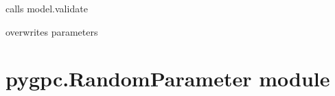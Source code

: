 \documentclass[letterpaper,10pt,english,openany,oneside]{sphinxmanual}
\begin{document}
\begin{fulllineitems}
\begin{fulllineitems}
calls model.validate

overwrites parameters

\end{fulllineitems}


\end{fulllineitems}



\section{pygpc.RandomParameter module}
\label{\detokenize{pygpc:module-pygpc.RandomParameter}}\label{\detokenize{pygpc:pygpc-randomparameter-module}}
\end{document}
